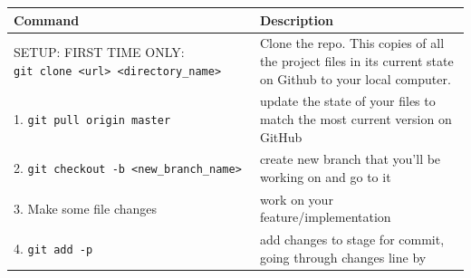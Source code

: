 \documentclass[]{book}
\begin{document}
\begin{longtable}[]{@{}ll@{}}
\toprule
\begin{minipage}[b]{0.13\columnwidth}\raggedright\strut
Command\strut
\end{minipage} & \begin{minipage}[b]{0.22\columnwidth}\raggedright\strut
Description\strut
\end{minipage}\tabularnewline
\midrule
\endhead
\begin{minipage}[t]{0.13\columnwidth}\raggedright\strut
SETUP: FIRST TIME ONLY:
\texttt{git\ clone\ \textless{}url\textgreater{}\ \textless{}directory\_name\textgreater{}}\strut
\end{minipage} & \begin{minipage}[t]{0.22\columnwidth}\raggedright\strut
Clone the repo. This copies of all the project files in its current
state on Github to your local computer.\strut
\end{minipage}\tabularnewline
\begin{minipage}[t]{0.13\columnwidth}\raggedright\strut
1. \texttt{git\ pull\ origin\ master}\strut
\end{minipage} & \begin{minipage}[t]{0.22\columnwidth}\raggedright\strut
update the state of your files to match the most current version on
GitHub\strut
\end{minipage}\tabularnewline
\begin{minipage}[t]{0.13\columnwidth}\raggedright\strut
2.
\texttt{git\ checkout\ -b\ \textless{}new\_branch\_name\textgreater{}}\strut
\end{minipage} & \begin{minipage}[t]{0.22\columnwidth}\raggedright\strut
create new branch that you'll be working on and go to it\strut
\end{minipage}\tabularnewline
\begin{minipage}[t]{0.13\columnwidth}\raggedright\strut
3. Make some file changes\strut
\end{minipage} & \begin{minipage}[t]{0.22\columnwidth}\raggedright\strut
work on your feature/implementation\strut
\end{minipage}\tabularnewline
\begin{minipage}[t]{0.13\columnwidth}\raggedright\strut
4. \texttt{git\ add\ -p}\strut
\end{minipage} & \begin{minipage}[t]{0.22\columnwidth}\raggedright\strut
add changes to stage for commit, going through changes line by

\end{minipage}
\end{longtable}
\end{document}
